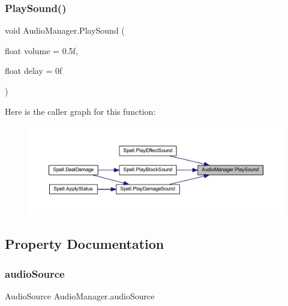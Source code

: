 \subsubsection{\texorpdfstring{PlaySound()}{PlaySound()}}
{\footnotesize\ttfamily void Audio\+Manager.\+Play\+Sound (\begin{DoxyParamCaption}\item[{float}]{volume = {\ttfamily 0.5f},  }\item[{float}]{delay = {\ttfamily 0f} }\end{DoxyParamCaption})}

Here is the caller graph for this function\+:\nopagebreak
\begin{figure}[H]
\begin{center}
\leavevmode
\includegraphics[width=350pt]{class_audio_manager_ac0f0dc189806848c224581b363b87396_icgraph}
\end{center}
\end{figure}


\subsection{Property Documentation}
\mbox{\label{class_audio_manager_a0c2aea6ea779d69228564aca9476ea80}} 
\subsubsection{\texorpdfstring{audioSource}{audioSource}}
{\footnotesize\ttfamily Audio\+Source Audio\+Manager.\+audio\+Source\hspace{0.3cm}{\ttfamily [get]}}

